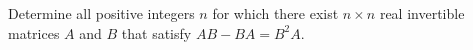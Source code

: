 Determine all positive integers \(n\) for which there exist \(n\times n\) real invertible matrices \(A\) and \(B\) that satisfy \(AB-BA=B^2A\).

